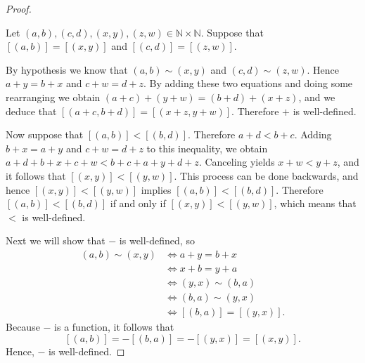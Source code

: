 \begin{proof}
	\begin{notmine}
		Let $(a, b), (c, d), (x, y), (z, w) \in \mathbb{N} \times \mathbb{N}$. Suppose that $[(a, b)] = [(x, y)]$ and $[(c, d)] = [(z, w)]$.

		By hypothesis we know that $(a, b) \sim (x, y)$ and $(c, d) \sim (z, w)$. Hence $a + y = b + x$ and $c + w=d + z$. By adding these two equations and doing some rearranging we obtain $(a + c) + (y + w) = (b + d) + (x + z)$, and we deduce that $[(a + c, b + d)] = [(x + z, y + w)]$. Therefore $+$ is well-defined.

		Now suppose that $[(a, b)] < [(b, d)]$. Therefore $a + d < b + c$. Adding $b + x = a + y$ and $c + w = d + z$ to this inequality, we obtain $a + d + b + x + c + w < b + c + a + y + d + z$. Canceling yields $x + w < y + z$, and it follows that $[(x, y)] < [(y, w)]$. This process can be done backwards, and hence $[(x,  y)] < [(y, w)]$ implies $[(a, b)] < [(b, d)]$. Therefore $[(a, b)] < [(b, d)]$ if and only if $[(x, y)] < [(y, w)]$, which means that $<$ is well-defined.
	\end{notmine}

	Next we will show that $-$ is well-defined, so
	\begin{align*}
		(a, b) \sim (x, y) & \iff a + y = b + x        \\
		                   & \iff x + b = y + a        \\
		                   & \iff (y, x) \sim (b, a)   \\
		                   & \iff (b, a) \sim (y, x)   \\
		                   & \iff [(b, a)] = [(y, x)].
	\end{align*}
	Because $-$ is a function, it follows that
	\[
		[(a, b)] = -[(b, a)] = -[(y, x)] = [(x, y)].
	\]
	Hence, $-$ is well-defined.


\end{proof}
